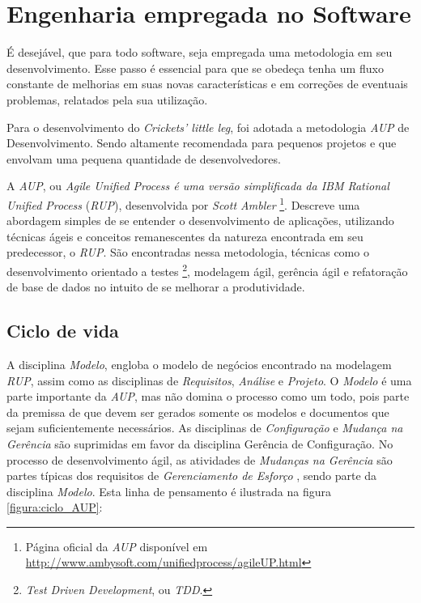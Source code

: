 \chapter{Engenharia empregada no Software}\label{3_engenharia_sw}

É desejável, que para todo software, seja empregada uma metodologia em seu desenvolvimento. Esse passo é essencial para que se obedeça tenha um fluxo constante de melhorias em suas novas características e em correções de eventuais problemas, relatados pela sua utilização.

Para o desenvolvimento do \textit{Crickets' little leg}, foi adotada a metodologia \textit{AUP} de Desenvolvimento. Sendo altamente recomendada para pequenos projetos e que envolvam uma pequena quantidade de desenvolvedores.

A \textit{AUP}, ou \textit{Agile Unified\textit{ Process} é uma versão simplificada da IBM Rational Unified Process} (\textit{RUP}), desenvolvida por \textit{Scott Ambler} \footnote{Página oficial da \textit{AUP} disponível em \url{http://www.ambysoft.com/unifiedprocess/agileUP.html}}. Descreve uma abordagem simples de se entender o desenvolvimento de aplicações, utilizando técnicas ágeis e conceitos remanescentes da natureza encontrada em seu predecessor, o \textit{RUP}. São encontradas nessa metodologia, técnicas como o desenvolvimento orientado a testes \footnote{\textit{Test Driven Development}, ou \textit{TDD}.}, modelagem ágil, gerência ágil e refatoração de base de dados no intuito de se melhorar a produtividade.

\section{Ciclo de vida}

A disciplina \textit{Modelo}, engloba o modelo de negócios encontrado na modelagem \textit{RUP}, assim como as disciplinas de \textit{Requisitos}, \textit{Análise} e \textit{Projeto}. O \textit{Modelo} é uma parte importante da \textit{AUP}, mas não domina o processo como um todo, pois parte da premissa de que devem ser gerados somente os modelos e documentos que sejam suficientemente necessários. As disciplinas de \textit{Configuração} e \textit{Mudança na Gerência} são suprimidas em favor da disciplina Gerência de Configuração. No processo de desenvolvimento ágil, as atividades de \textit{Mudanças na Gerência} são partes típicas dos requisitos de \textit{Gerenciamento de Esforço} \cite{ProgrammingLanguages}, sendo parte da disciplina \textit{Modelo}. Esta linha de pensamento é ilustrada na figura \ref{figura:ciclo_AUP}:

